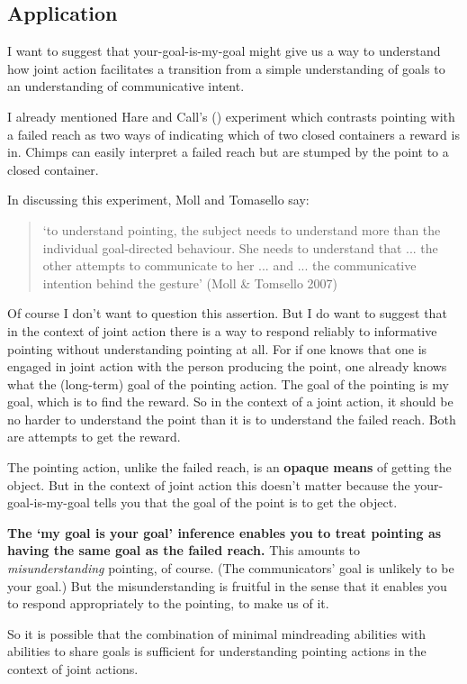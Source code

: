 \documentclass[12pt,a4paper]{extarticle}
\begin{document}
\subsection{Application}
I want to suggest that your-goal-is-my-goal might give us a way to understand how joint action facilitates a transition from a simple understanding of goals to an understanding of communicative intent.

I already mentioned Hare and Call's (\citeyear{hare_chimpanzees_2004}) experiment which contrasts pointing with a failed reach as two ways of indicating which of two closed containers a reward is in.  
Chimps can easily interpret a failed reach but are stumped by the point to a closed container.

In discussing this experiment, Moll and Tomasello say:
%
\begin{quote}
`to understand pointing, the subject needs to understand more than the individual goal-directed behaviour. She needs to understand that ... the other attempts to communicate to her ...  and ... the communicative intention behind the gesture'
(Moll \& Tomsello 2007)
\end{quote}
%
Of course I don't want to question this assertion.
But I do want to suggest that in the context of joint action there is a way to respond reliably to informative pointing without understanding pointing at all.
For if one knows that one is engaged in joint action with the person producing the point, one already knows what the (long-term) goal of the pointing action.  
The goal of the pointing is my goal, which is to find the reward.
So in the context of a joint action, it should be no harder to understand the point than it is to understand the failed reach.
Both are attempts to get the reward.

The pointing action, unlike the failed reach, is an \textbf{opaque means} of getting the object.  But in the context of joint action this doesn't matter because the your-goal-is-my-goal tells you that the goal of the point is to get the object.

\textbf{The `my goal is your goal' inference enables you to treat pointing as having the same goal as the failed reach.}
This amounts to \emph{misunderstanding} pointing, of course.  
(The communicators' goal is unlikely to be your goal.)
But the misunderstanding is fruitful in the sense that it enables you to respond appropriately to the pointing, to make us of it.

So it is possible that the combination of minimal mindreading abilities with abilities to share goals is sufficient for understanding pointing actions in the context of joint actions.
\end{document}
